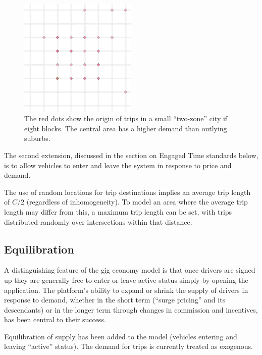 \documentclass[
  letterpaper,
]{article}
\begin{document}
\begin{figure}

{\centering \includegraphics[width=0.5\textwidth,height=\textheight]{fig3.png}

}

\caption{\label{fig-3}The red dots show the origin of trips in a small
``two-zone'' city if eight blocks. The central area has a higher demand
than outlying suburbs.}

\end{figure}

The second extension, discussed in the section on Engaged Time standards
below, is to allow vehicles to enter and leave the system in response to
price and demand.

The use of random locations for trip destinations implies an average
trip length of \(C/2\) (regardless of inhomogeneity). To model an area
where the average trip length may differ from this, a maximum trip
length can be set, with trips distributed randomly over intersections
within that distance.

\hypertarget{equilibration}{%
\subsection{Equilibration}\label{equilibration}}

A distinguishing feature of the gig economy model is that once drivers
are signed up they are generally free to enter or leave active status
simply by opening the application. The platform's ability to expand or
shrink the supply of drivers in response to demand, whether in the short
term (``surge pricing'' and its descendants) or in the longer term
through changes in commission and incentives, has been central to their
success.

Equilibration of supply has been added to the model (vehicles entering
and leaving ``active'' status). The demand for trips is currently
treated as exogenous.
\end{document}
